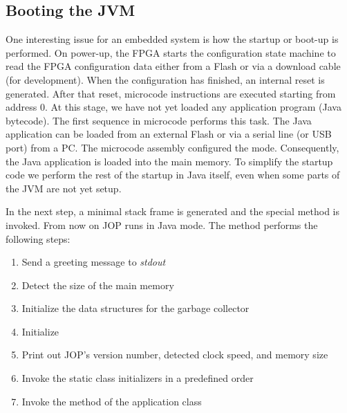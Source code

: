 \subsection{Booting the JVM}

One interesting issue for an embedded system is how the startup or
boot-up is performed. On power-up, the FPGA starts the configuration
state machine to read the FPGA configuration data either from a Flash
or via a download cable (for development). When the configuration has
finished, an internal reset is generated. After that reset, microcode
instructions are executed starting from address 0. At this stage, we
have not yet loaded any application program (Java bytecode). The
first sequence in microcode performs this task. The Java application
can be loaded from an external Flash or via a serial line (or USB
port) from a PC. The microcode assembly configured the mode.
Consequently, the Java application is loaded into the main memory. To
simplify the startup code we perform the rest of the startup in Java
itself, even when some parts of the JVM are not yet setup.

In the next step, a minimal stack frame is generated and the special
method  is invoked. From now on JOP runs in
Java mode. The method  performs the following steps:
\begin{samepage}
\begin{enumerate}
    \item Send a greeting message to \emph{stdout}
    \item Detect the size of the main memory
    \item Initialize the data structures for the garbage collector
    \item Initialize 
    \item Print out JOP's version number, detected clock speed, and
    memory size
    \item Invoke the static class initializers in a predefined order
    \item Invoke the  method of the application class
\end{enumerate}
\end{samepage}

